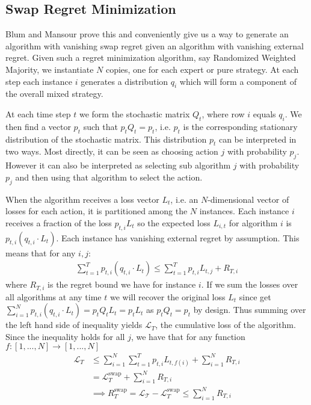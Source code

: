 \documentclass{article}
\begin{document}
\subsection{Swap Regret Minimization}

Blum and Mansour\cite{blum2007external} prove this and conveniently give us a way to generate an algorithm with vanishing swap regret given an algorithm with vanishing external regret. Given such a regret minimization algorithm, say Randomized Weighted Majority, we instantiate $N$ copies, one for each expert or pure strategy. At each step each instance $i$ generates a distribution $q_i$ which will form a component of the overall mixed strategy.

At each time step $t$ we form the stochastic matrix $Q_t$, where row $i$ equals $q_i$. We then find a vector $p_t$ such that $p_t Q_t = p_t$, i.e. $p_t$ is the corresponding stationary distribution of the stochastic matrix. This distribution $p_t$ can be interpreted in two ways. Most directly, it can be seen as choosing action $j$ with probability $p_j$. However it can also be interpreted as selecting sub algorithm $j$ with probability $p_j$ and then using that algorithm to select the action. 

When the algorithm receives a loss vector $L_t$, i.e. an $N$-dimensional vector of losses for each action, it is partitioned among the $N$ instances. Each instance $i$ receives a fraction of the loss $p_{t,i} L_t$ so the expected loss $L_{i,t}$ for algorithm $i$ is $p_{t,i} (q_{t,i} \cdot L_t)$. 
Each instance has vanishing external regret by assumption. This means that for any $i,j$:
\begin{align*}
\sum_{t=1}^T p_{t,i} (q_{t,i}\cdot L_t) \le \sum_{t=1}^T p_{t,i} L_{t,j} + R_{T,i}
\end{align*}
\noindent where $R_{T,i}$ is the regret bound we have for instance $i$. If we sum the losses over all algorithms at any time $t$ we will recover the original loss $L_t$ since get $\sum_{i=1}^N p_{t,i}(q_{t,i}\cdot L_t) = p_t Q_t L_t = p_t L_t$ as $p_t Q_t = p_t$ by design. Thus summing over the left hand side of inequality yields $\mathcal{L}_T$, the cumulative loss of the algorithm. Since the inequality holds for all $j$, we have that for any function $f : [1,...,N] \rightarrow [1,...,N]$
\begin{align*}
    \mathcal{L}_T & \le \sum_{i=1}^N\sum_{t=1}^T p_{t,i} L_{t,f(i)} + \sum_{i=1}^N R_{T,i}\\
    & = \mathcal{L}_T^{\text{swap}} + \sum_{i=1}^N R_{T,i}\\
    & \implies R_T^{\text{swap}} = \mathcal{L_T} - \mathcal{L}_T^{\text{swap}} \le \sum_{i=1}^N R_{T,i}
\end{align*}
\end{document}
